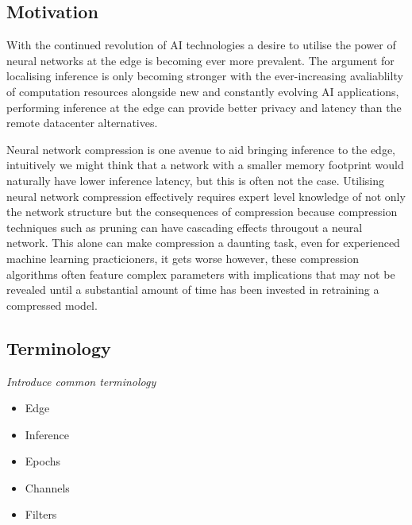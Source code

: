 \documentclass[../Dissertation.tex]{subfiles}
\begin{document}
\subsection{Motivation}
With the continued revolution of AI technologies a desire to utilise the power of neural networks at the edge is becoming ever more prevalent.
The argument for localising inference is only becoming stronger with the ever-increasing avaliablilty of computation resources alongside new and constantly evolving AI applications, performing inference at the edge can provide better privacy and latency than the remote datacenter alternatives.



Neural network compression is one avenue to aid bringing inference to the edge, intuitively we might think that a network with a smaller memory footprint would naturally have lower inference latency, but this is often not the case.
Utilising neural network compression effectively requires expert level knowledge of not only the network structure but the consequences of compression because compression techniques such as pruning can have cascading effects througout a neural network.
This alone can make compression a daunting task, even for experienced machine learning practicioners, it gets worse however, these compression algorithms often feature complex parameters with implications that may not be revealed until a substantial amount of time has been invested in retraining a compressed model.

\subsection{Terminology}
\emph{\color{red}Introduce common terminology}


\begin{itemize}
    \item Edge
    \item Inference
    \item Epochs
    \item Channels
    \item Filters
\end{itemize}
\end{document}
